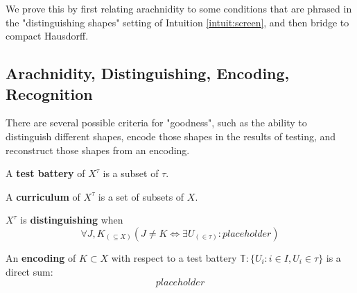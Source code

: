 We prove this by first relating arachnidity to some conditions that are phrased in the "distinguishing shapes" setting of Intuition \ref{intuit:screen}, and then bridge to compact Hausdorff.

\subsection{Arachnidity, Distinguishing, Encoding, Recognition}

 There are several possible criteria for "goodness", such as the ability to distinguish different shapes, encode those shapes in the results of testing, and reconstruct those shapes from an encoding.

\begin{defn}
A \textbf{test battery} of $X^\tau$ is a subset of $\tau$.
\end{defn}
\begin{defn}[Curriculum]
A \textbf{curriculum} of $X^\tau$ is a set of subsets of $X$.
\end{defn}

\begin{defn}[Distinguishing]\label{def:distinguish}
$X^\tau$ is \textbf{distinguishing} when
\[\forall J,K_{(\subseteq X)} (J \neq K \iff \exists U_{(\in \tau)}: placeholder)\]
\end{defn}

\begin{defn}[Encoding]
An \textbf{encoding} of $K \subset X$ with respect to a test battery $\mathbb{T}: \{U_i : i \in I, U_i \in \tau\}$ is a direct sum:
\[placeholder\]
\end{defn}

